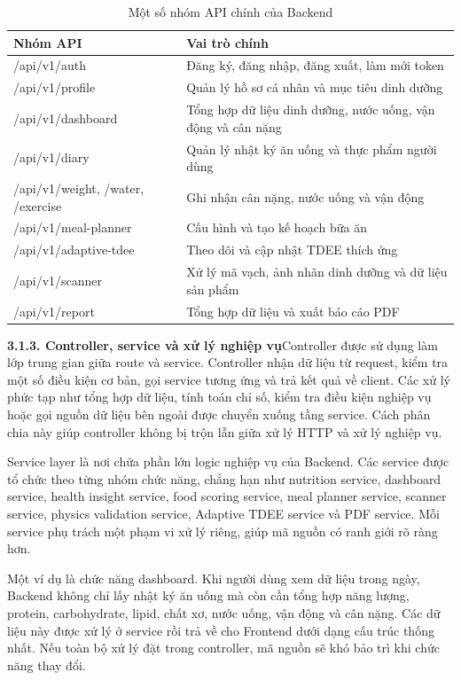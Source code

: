 \begin{table}[H]
\centering
\caption{Một số nhóm API chính của Backend}
\begin{tabular}{|p{4cm}|p{11cm}|}
\hline
\textbf{Nhóm API} & \textbf{Vai trò chính} \\ \hline
/api/v1/auth & Đăng ký, đăng nhập, đăng xuất, làm mới token \\ \hline
/api/v1/profile & Quản lý hồ sơ cá nhân và mục tiêu dinh dưỡng \\ \hline
/api/v1/dashboard & Tổng hợp dữ liệu dinh dưỡng, nước uống, vận động và cân nặng \\ \hline
/api/v1/diary & Quản lý nhật ký ăn uống và thực phẩm người dùng \\ \hline
/api/v1/weight, /water, /exercise & Ghi nhận cân nặng, nước uống và vận động \\ \hline
/api/v1/meal-planner & Cấu hình và tạo kế hoạch bữa ăn \\ \hline
/api/v1/adaptive-tdee & Theo dõi và cập nhật TDEE thích ứng \\ \hline
/api/v1/scanner & Xử lý mã vạch, ảnh nhãn dinh dưỡng và dữ liệu sản phẩm \\ \hline
/api/v1/report & Tổng hợp dữ liệu và xuất báo cáo PDF \\ \hline
\end{tabular}
\end{table}

\textbf{3.1.3. Controller, service và xử lý nghiệp vụ}Controller được sử dụng làm lớp trung gian giữa route và service. Controller nhận dữ liệu từ request, kiểm tra một số điều kiện cơ bản, gọi service tương ứng và trả kết quả về client. Các xử lý phức tạp như tổng hợp dữ liệu, tính toán chỉ số, kiểm tra điều kiện nghiệp vụ hoặc gọi nguồn dữ liệu bên ngoài được chuyển xuống tầng service. Cách phân chia này giúp controller không bị trộn lẫn giữa xử lý HTTP và xử lý nghiệp vụ.

Service layer là nơi chứa phần lớn logic nghiệp vụ của Backend. Các service được tổ chức theo từng nhóm chức năng, chẳng hạn như nutrition service, dashboard service, health insight service, food scoring service, meal planner service, scanner service, physics validation service, Adaptive TDEE service và PDF service. Mỗi service phụ trách một phạm vi xử lý riêng, giúp mã nguồn có ranh giới rõ ràng hơn.

Một ví dụ là chức năng dashboard. Khi người dùng xem dữ liệu trong ngày, Backend không chỉ lấy nhật ký ăn uống mà còn cần tổng hợp năng lượng, protein, carbohydrate, lipid, chất xơ, nước uống, vận động và cân nặng. Các dữ liệu này được xử lý ở service rồi trả về cho Frontend dưới dạng cấu trúc thống nhất. Nếu toàn bộ xử lý đặt trong controller, mã nguồn sẽ khó bảo trì khi chức năng thay đổi.

